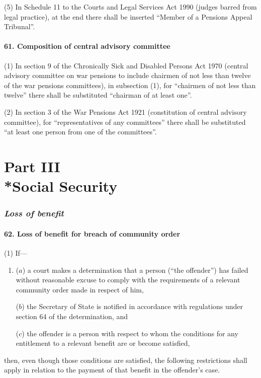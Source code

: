 \documentclass[12pt,a4paper]{article}
\begin{document}
(5) In Schedule 11 to the Courts and Legal Services Act 1990 (judges barred from legal practice), at the end there shall be inserted “Member of a Pensions Appeal Tribunal”.

\subsection{61. Composition of central advisory committee}

(1) In section 9 of the Chronically Sick and Disabled Persons Act 1970 (central advisory committee on war pensions to include chairmen of not less than twelve of the war pensions committees), in subsection (1), for “chairmen of not less than twelve” there shall be substituted “chairman of at least one”.

(2) In section 3 of the War Pensions Act 1921 (constitution of central advisory committee), for “representatives of any committees” there shall be substituted “at least one person from one of the committees”.

\part[Part III --- Social Security]{Part III\\*Social Security}

\renewcommand\parthead{--- Part III}

\section{\itshape Loss of benefit}

\subsection{62. Loss of benefit for breach of community order}

(1) If—
\begin{enumerate}\item[]
($a$) a court makes a determination that a person (“the offender”) has failed without reasonable excuse to comply with the requirements of a relevant community order made in respect of him,

($b$) the Secretary of State is notified in accordance with regulations under section 64 of the determination, and

($c$) the offender is a person with respect to whom the conditions for any entitlement to a relevant benefit are or become satisfied,
\end{enumerate}
then, even though those conditions are satisfied, the following restrictions shall apply in relation to the payment of that benefit in the offender’s case.
\end{document}
